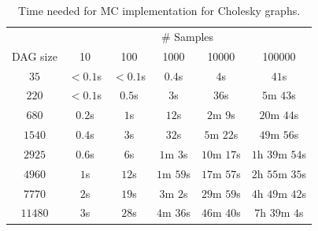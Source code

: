 \documentclass[12pt]{article}
\begin{document}
\begin{table}
	\caption{Time needed for MC implementation for Cholesky graphs.} 
	\begin{center}	
		\begin{tabular}{c c c c c c}
                  \toprule
                  & \multicolumn{5}{c}{\# Samples}     \\
                  \cmidrule{2-6}
                  DAG size & 10 & 100 & 1000 & 10000 & 100000\\
                  \cmidrule{1-6}
                  $35$ & $<0.1$s & $<0.1$s & $0.4$s & $4$s & $41$s\\
                  $220$  & $<0.1$s & $0.5$s & $3$s & $36$s & $5$m $43$s\\
                  $680$ & $0.2$s & $1$s & $12$s & $2$m $9$s & $20$m $44$s\\
                  $1540$ & $0.4$s & $3$s & $32$s & $5$m $22$s & $49$m $56$s\\
                  $2925$ & $0.6$s & $6$s & $1$m $3$s & $10$m $17$s & $1$h $39$m $54$s\\
                  $4960$ & $1$s & $12$s & $1$m $59$s & $17$m $57$s & $2$h $55$m $35$s\\
                  $7770$ & $2$s & $19$s & $3$m $2$s & $29$m $59$s & $4$h $49$m $42$s\\
                  $11480$ & $3$s & $28$s & $4$m $36$s & $46$m $40$s & $7$h $39$m $4$s\\
		\bottomrule
		\end{tabular}
		\label{tb.mc_timings}
	\end{center}	
      \end{table}

\end{document}
